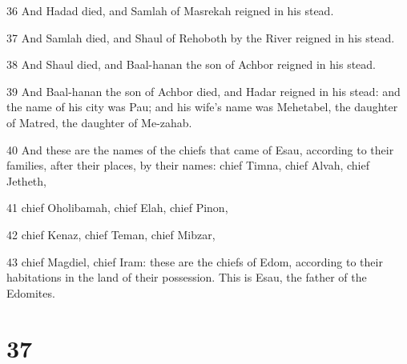 \par 36 And Hadad died, and Samlah of Masrekah reigned in his stead.
\par 37 And Samlah died, and Shaul of Rehoboth by the River reigned in his stead.
\par 38 And Shaul died, and Baal-hanan the son of Achbor reigned in his stead.
\par 39 And Baal-hanan the son of Achbor died, and Hadar reigned in his stead: and the name of his city was Pau; and his wife's name was Mehetabel, the daughter of Matred, the daughter of Me-zahab.
\par 40 And these are the names of the chiefs that came of Esau, according to their families, after their places, by their names: chief Timna, chief Alvah, chief Jetheth,
\par 41 chief Oholibamah, chief Elah, chief Pinon,
\par 42 chief Kenaz, chief Teman, chief Mibzar,
\par 43 chief Magdiel, chief Iram: these are the chiefs of Edom, according to their habitations in the land of their possession. This is Esau, the father of the Edomites.

\chapter{37}

